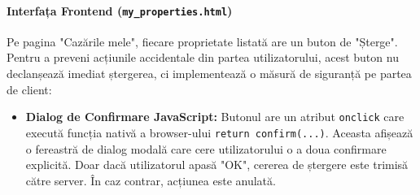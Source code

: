 \documentclass[12pt, a4paper, oneside, romanian]{teza-upb}
\begin{document}
\paragraph{Interfața Frontend (\texttt{my\_properties.html})}
Pe pagina "Cazările mele", fiecare proprietate listată are un buton de "Șterge". Pentru a preveni acțiunile accidentale din partea utilizatorului, acest buton nu declanșează imediat ștergerea, ci implementează o măsură de siguranță pe partea de client:
\begin{itemize}
	\item \textbf{Dialog de Confirmare JavaScript:} Butonul are un atribut \texttt{onclick} care execută funcția nativă a browser-ului \texttt{return confirm(...)}. Aceasta afișează o fereastră de dialog modală care cere utilizatorului o a doua confirmare explicită. Doar dacă utilizatorul apasă "OK", cererea de ștergere este trimisă către server. În caz contrar, acțiunea este anulată.
\end{itemize}
\end{document}
